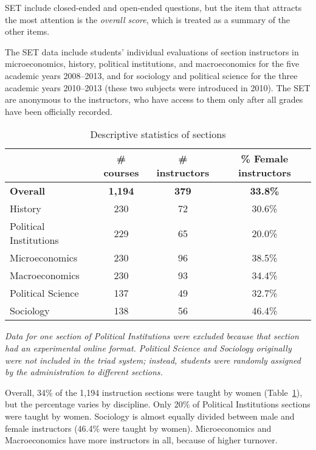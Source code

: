 \documentclass[12pt]{article}
\begin{document}
SET include closed-ended and open-ended questions, 
but the item that attracts the most attention is the \emph{overall score}, 
which is treated as a summary of the other items.

The SET data include students' individual evaluations of section
instructors in microeconomics, history, political institutions, and 
macroeconomics for the five academic years 2008--2013, and for 
sociology and political science for the three academic years 2010--2013 
(these two subjects were introduced in 2010). 
The SET are anonymous to the instructors, who have access to them only after 
all grades have been officially recorded.  

\begin{table}[htbp]
  \centering
  \footnotesize 
  \caption{Descriptive statistics of sections}
    \begin{tabular}{lccc}
    \toprule 
                        & \# courses & \# instructors  & \% Female instructors  \\
   \midrule
  \textbf{Overall} &  \textbf{1,194} & \textbf{379}  &\textbf{33.8\%} \\
    History    &               230 &      72          &   30.6\% \\
    Political Institutions  &  229 &      65          &   20.0\% \\    
    Microeconomics   &         230 &      96          &   38.5\% \\
    Macroeconomics   &         230 &      93          &   34.4\% \\
    Political Science &       137 &      49          &   32.7\% \\
    Sociology   &              138 &      56          &   46.4\%    \\
    \bottomrule
    \end{tabular}%
 \label{tab:description}%
 
\textit{Data for one section of Political Institutions were excluded because that 
section had an experimental online format. 
Political Science and Sociology originally were not included in the triad system; instead, students were randomly assigned by the administration to different sections.
} 

\end{table}%
\normalsize

Overall, 34\% of the 1,194 instruction sections were taught by women 
(Table~\ref{tab:description}), but the percentage varies by discipline. 
Only 20\% of Political Institutions sections were taught by women. 
Sociology is almost equally divided between male and female instructors (46.4\% were taught by women). 
Microeconomics and Macroeconomics have more instructors in all, because of higher turnover.
\end{document}
